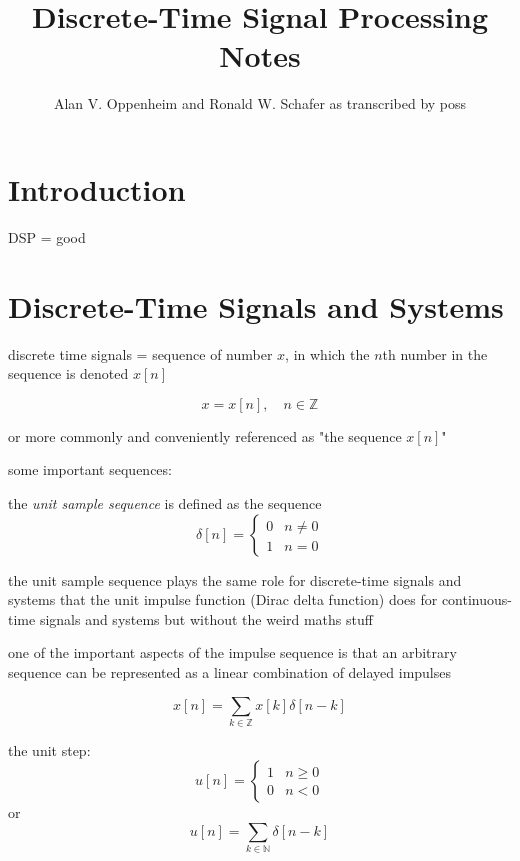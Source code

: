 \documentclass{article}
\title{Discrete-Time Signal Processing Notes}
\author{Alan V. Oppenheim and Ronald W. Schafer as transcribed by poss}
\begin{document}
\maketitle{}

\section{Introduction}

DSP = good

\section{Discrete-Time Signals and Systems}

discrete time signals = sequence of number \(x\), in which the \(n\)th number in the sequence is denoted \(x[n]\)

\[
	x = {x[n]}, \quad n \in \mathbb{Z} 
\]

or more commonly and conveniently referenced as "the sequence \(x[n]\)"


some important sequences:


the \textit{unit sample sequence} is defined as the sequence
\[
	\delta{}[n] =
	\begin{cases} 
		0 & n \neq 0 \\
		1 & n = 0
	\end{cases}
\]

the unit sample sequence plays the same role for discrete-time signals and systems that the unit impulse function (Dirac delta function) does for continuous-time signals and systems but without the weird maths stuff 


one of the important aspects of the impulse sequence is that an arbitrary sequence can be represented as a linear combination of delayed impulses

\[
	x[n] = \sum_{k \in \mathbb{Z}} x[k] \delta{}[n - k]
\]


the unit step:
\[
	u{}[n] =
	\begin{cases} 
		1 & n \geq{} 0\\
		0 & n < 0
	\end{cases}
\]
or
\[
	u[n] = \sum_{k \in \mathbb{N}} \delta{}[n - k]
\]
\end{document}
